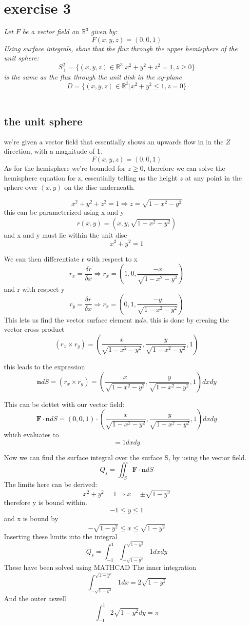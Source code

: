 \section{exercise 3}
\textit{Let $F$ be a vector field on $\mathbb{R}^3$ given by:}
\[F(x,y,z) = (0,0,1)\]
\textit{Using surface integrals, show that the flux through the upper hemisphere of the unit sphere:}
\[S_{+}^2 = \{(x,y,z)\in \mathbb{R}^3  |x^2+y^2+z^2 = 1, z \geq 0\}\] 
\textit{is the same as the flux through the unit disk in the xy-plane}
\[D = \{(x,y,z)\in \mathbb{R}^3 |x^2+y^2 \leq 1, z=0\}\]\\

\subsection{the unit sphere}
we're given a vector field that essentially shows an upwards flow in
in the $Z$ direction, with a magnitude of 1. 
\[F(x,y,z) = (0,0,1)\]
As for the hemisphere we're bounded for $ z\geq0$, therefore
we can solve the hemisphere equation for z, essentially telling us
the height $z$ at any point in the sphere over $(x,y)$ on the disc underneath.

\[x^2+y^2+z^2 = 1 \Rightarrow z = \sqrt{1-x^2-y^2}\]
this can be parameterized using x and y 
\[r(x,y) = (x,y,\sqrt{1-x^2-y^2})\]
and x and y must lie within the unit disc
\[x^2+y^2 = 1\]

We can then differentiate r with respect to x 
\[r_x = \frac{\delta r}{\delta x} \Rightarrow r_x = (1,0, \frac{-x}{\sqrt{1-x^2-y^2}})\]
and r with respect y
\[r_y = \frac{\delta r}{\delta x} \Rightarrow r_x = (0,1, \frac{-y}{\sqrt{1-x^2-y^2}})\]
This lets us find the vector surface element $\textbf{n}ds$, this is done by creaing the
vector cross product 
\[ (r_x \times r_y) = (\frac{x}{\sqrt{1-x^2-y^2}},\frac{y}{\sqrt{1-x^2-y^2}},1 )\]

this leads to the expression 
\[\textbf{n}dS = (r_x \times r_y) = (\frac{x}{\sqrt{1-x^2-y^2}},\frac{y}{\sqrt{1-x^2-y^2}},1 ) dx dy\]

This can be dottet with our vector field:
\[\textbf{F} \cdot \textbf{n} dS = (0,0,1) \cdot (\frac{x}{\sqrt{1-x^2-y^2}},\frac{y}{\sqrt{1-x^2-y^2}},1 ) dx dy \]
which evaluates to 
\[= 1 dx dy\]

Now we can find the surface integral over the surface S, by using the vector field.
\[Q_s = \iint_S \textbf{F} \cdot \textbf{n} dS\]
The limits here can be derived:
\[x^2+y^2 = 1 \Rightarrow x = \pm \sqrt{1-y^2}\]
therefore y is bound within.
\[-1\leq y \leq1\]
and x is bound by
\[-\sqrt{1-y^2} \leq x \leq \sqrt{1-y^2}\]
Inserting these limits into the integral
\[Q_s = \int_{-1}^{1}\int_{-\sqrt{1-y^2}}^{\sqrt{1-y^2}} 1 dx dy\]
These have been solved using MATHCAD
The inner integration 
\[\int_{-\sqrt{1-y^2}}^{\sqrt{1-y^2}} 1 dx = 2\sqrt{1-y^2}\]
And the outer aswell
\[\int_{-1}^{1}2\sqrt{1-y^2} dy = \pi \] 

